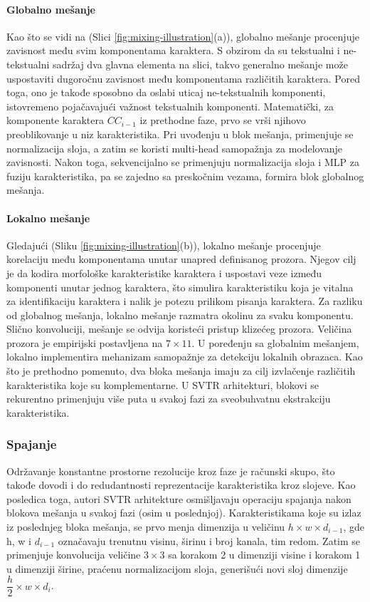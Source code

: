 \documentclass[a4paper,12pt]{article}
\begin{document}
	\paragraph{Globalno mešanje}
	Kao što se vidi na (Slici \ref{fig:mixing-illustration}(a)), globalno mešanje procenjuje zavisnost među svim komponentama karaktera. S obzirom da su tekstualni i ne-tekstualni sadržaj dva glavna elementa na slici, takvo generalno mešanje može uspostaviti dugoročnu zavisnost među komponentama različitih karaktera. Pored toga, ono je takođe sposobno da oslabi uticaj ne-tekstualnih komponenti, istovremeno pojačavajući važnost tekstualnih komponenti. Matematički, za komponente karaktera \(CC_{i-1}\) iz prethodne faze, prvo se vrši njihovo preoblikovanje u niz karakteristika. Pri uvođenju u blok mešanja, primenjuje se normalizacija sloja, a zatim se koristi multi-head samopažnja za modelovanje zavisnosti. Nakon toga, sekvencijalno se primenjuju normalizacija sloja i MLP za fuziju karakteristika, pa se zajedno sa preskočnim vezama, formira blok globalnog mešanja.
	
	\paragraph{Lokalno mešanje}
	Gledajući (Sliku \ref{fig:mixing-illustration}(b)), lokalno mešanje procenjuje korelaciju među komponentama unutar unapred definisanog prozora. Njegov cilj je da kodira morfološke karakteristike karaktera i uspostavi veze između komponenti unutar jednog karaktera, što simulira karakteristiku koja je vitalna za identifikaciju karaktera i nalik je potezu prilikom pisanja karaktera. Za razliku od globalnog mešanja, lokalno mešanje razmatra okolinu za svaku komponentu. Slično konvoluciji, mešanje se odvija koristeći pristup klizećeg prozora. Veličina prozora je empirijski postavljena na \(7 \times 11\). U poređenju sa globalnim mešanjem, lokalno implementira mehanizam samopažnje za detekciju lokalnih obrazaca. Kao što je prethodno pomenuto, dva bloka mešanja imaju za cilj izvlačenje različitih karakteristika koje su komplementarne. U SVTR arhitekturi, blokovi se rekurentno primenjuju više puta u svakoj fazi za sveobuhvatnu ekstrakciju karakteristika.
	
	\subsubsection{Spajanje}
	Održavanje konstantne prostorne rezolucije kroz faze je računski skupo, što takođe dovodi i do redudantnosti reprezentacije karakteristika kroz slojeve. Kao posledica toga, autori SVTR arhitekture osmišljavaju operaciju spajanja nakon blokova mešanja u svakoj fazi (osim u poslednjoj). Karakteristikama koje su izlaz iz poslednjeg bloka mešanja, se prvo menja dimenzija u veličinu \(h \times w \times d_{i-1}\), gde h, w i \(d_{i-1}\) označavaju trenutnu visinu, širinu i broj kanala, tim redom. Zatim se primenjuje konvolucija veličine \(3 \times 3\) sa korakom 2 u dimenziji visine i korakom 1 u dimenziji širine, praćenu normalizacijom sloja, generišući novi sloj dimenzije \(\dfrac{h}{2} \times w \times d_i\).
	
\end{document}
